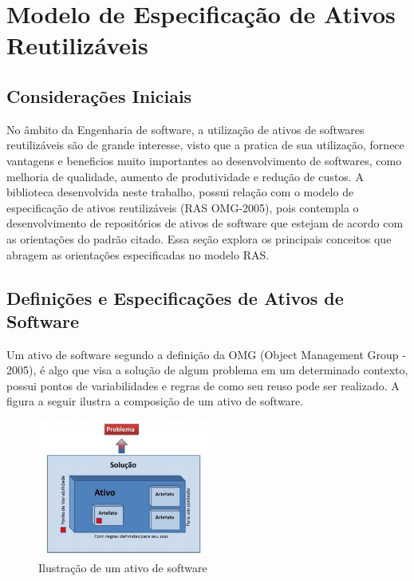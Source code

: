 \section{Modelo de Especificação de Ativos Reutilizáveis}

\subsection{Considerações Iniciais}

    No âmbito da Engenharia de software, a utilização de ativos de softwares reutilizáveis são de grande interesse, visto que a pratica de sua utilização, fornece vantagens e beneficios muito importantes ao desenvolvimento de softwares, como melhoria de qualidade, aumento de produtividade e redução de custos.
	A biblioteca desenvolvida neste trabalho, possui relação com o modelo de especificação de ativos reutilizáveis (RAS OMG-2005), pois contempla o desenvolvimento de repositórios de ativos de software que estejam de acordo com as orientações do padrão citado. Essa seção explora os principais conceitos que abragem as orientações especificadas no modelo RAS.

\subsection{Definições e Especificações de Ativos de Software}

Um ativo de software segundo a definição da OMG (Object Management Group - 2005), é algo que visa a solução de algum problema em um determinado contexto, possui pontos de variabilidades e regras de como seu reuso pode ser realizado. A figura a seguir ilustra a composição de um ativo de software.

\begin{figure}[H]
\includegraphics[width=0.5\textwidth]{images/ativo}
\centering
\caption{Ilustração de um ativo de software}
\label{Rotulo}
\end{figure}

